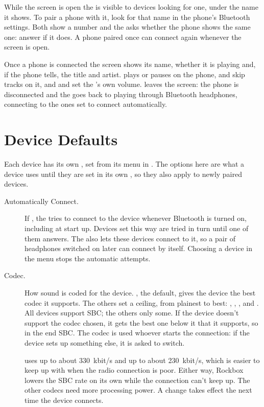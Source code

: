 While the screen is open the \dap{} is visible to devices looking for one,
under the name it shows. To pair a phone with it, look for that name in the
phone's Bluetooth settings. Both show a number and the \dap{} asks whether
the phone shows the same one: answer  if it does. A phone
paired once can connect again whenever the screen is open.

Once a phone is connected the screen shows its name, whether it is playing
and, if the phone tells, the title and artist. \ActionWpsPlay{} plays or
pauses on the phone, \ActionWpsSkipNext{} and \ActionWpsSkipPrev{} skip
tracks on it, and \ActionWpsVolUp{} and \ActionWpsVolDown{} set the
\dap{}'s own volume. \ActionWpsBrowse{} leaves the screen: the phone is
disconnected and the \dap{} goes back to playing
through Bluetooth headphones, connecting to the ones set to connect
automatically.

\section{\label{ref:BluetoothOptions}Device Defaults}
Each device has its own , set from its menu in
. The options here are what a device uses until they are
set in its own , so they also apply to newly paired
devices.

\begin{description}
  \item[Automatically Connect.] If , the \dap{} tries to
    connect to the device whenever Bluetooth is turned on, including at
    start up. Devices set this way are tried in turn until one of them
    answers. The \dap{} also lets these devices connect to it, so a pair
    of headphones switched on later can connect by itself. Choosing a
    device in the  menu stops the automatic attempts.
  \item[Codec.] How sound is coded for the device. , the default, gives the device the best codec it supports.
    The others set a ceiling, from plainest to best: , , ,  and . All devices support SBC; the others only some.
    If the device doesn't support the codec chosen, it gets the best one
    below it that it supports, so in the end SBC. The codec is used whoever
    starts the connection: if the device sets up something else, it is asked
    to switch.

     uses up to about 330~kbit/s and
     up to about 230~kbit/s, which is easier
    to keep up with when the radio connection is poor. Either way, Rockbox
    lowers the SBC rate on its own while the connection can't keep up.
    The other codecs need more processing power. A change takes effect the
    next time the device connects.
\end{description}

